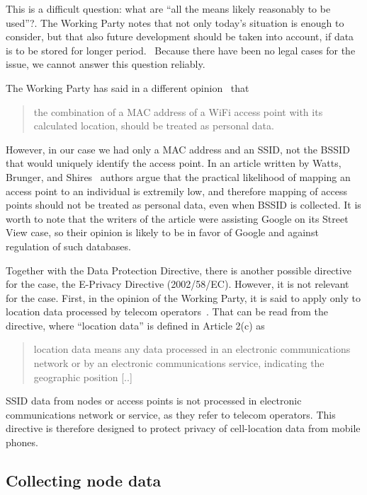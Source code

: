 \documentclass[12pt,a4paper,oneside,pdftex]{report}
\begin{document}
This is a difficult question: what are ``all the means likely reasonably to be used''?. The Working Party notes that not only today's situation is enough to consider, but that also future development should be taken into account, if data is to be stored for longer period.~\cite{wp29_136} Because there have been no legal cases for the issue, we cannot answer this question reliably.

The Working Party has said in a different opinion~\cite{wp29_185} that 
\begin{quote}
    the combination of a MAC address of a WiFi access point with its calculated location, should be treated as personal data.
\end{quote}

However, in our case we had only a MAC address and an SSID, not the BSSID that would uniquely identify the access point. In an article written by Watts, Brunger, and Shires~\cite{watts2011european} authors argue that the practical likelihood of mapping an access point to an individual is extremily low, and therefore mapping of access points should not be treated as personal data, even when BSSID is collected. It is worth to note that the writers of the article were assisting Google on its Street View case, so their opinion is likely to be in favor of Google and against regulation of such databases.

Together with the Data Protection Directive, there is another possible directive for the case, the E-Privacy Directive (2002/58/EC). However, it is not relevant for the case. First, in the opinion of the Working Party, it is said to apply only to location data processed by telecom operators~\cite{wp29_185}. That can be read from the directive, where ``location data'' is defined in Article 2(c) as

\begin{quote}
    location data means any data processed in an electronic communications network or by an electronic communications service, indicating the geographic position [..]
\end{quote} 

SSID data from nodes or access points is not processed in electronic communications network or service, as they refer to telecom operators. This directive is therefore designed to protect privacy of cell-location data from mobile phones.

\subsection{Collecting node data}
\end{document}
